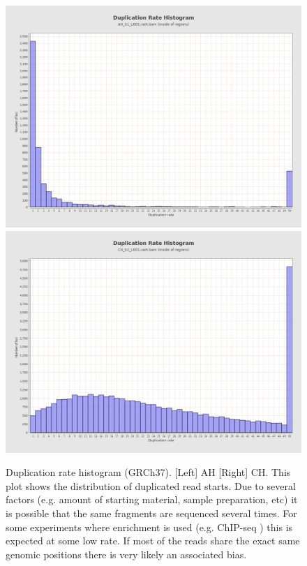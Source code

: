 \documentclass{article}
\begin{document}
\begin{figure}[ht] \hspace*{0cm} 
\begin{center}
    \includegraphics[scale=0.15]{qualimap/AH_S1_L001.sort_stats/images_qualimapReport/genome_uniq_read_starts_histogram}
        \includegraphics[scale=0.15]{qualimap/CH_S2_L001.sort_stats/images_qualimapReport/genome_uniq_read_starts_histogram}
	\caption{
	Duplication rate histogram (GRCh37). [Left] AH [Right] CH.
	This plot shows the distribution of duplicated read starts. Due to several factors (e.g. amount of starting material, sample preparation, etc) it is possible that the same fragments are sequenced several times. For some experiments where enrichment is used (e.g. ChIP-seq ) this is expected at some low rate. If most of the reads share the exact same genomic positions there is very likely an associated bias.
	}
	\label{fig:qualimap_dup_hist}
\end{center}
\end{figure}
\end{document}
